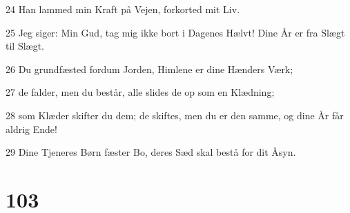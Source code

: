 \par 24 Han lammed min Kraft på Vejen, forkorted mit Liv.
\par 25 Jeg siger: Min Gud, tag mig ikke bort i Dagenes Hælvt! Dine År er fra Slægt til Slægt.
\par 26 Du grundfæsted fordum Jorden, Himlene er dine Hænders Værk;
\par 27 de falder, men du består, alle slides de op som en Klædning;
\par 28 som Klæder skifter du dem; de skiftes, men du er den samme, og dine År får aldrig Ende!
\par 29 Dine Tjeneres Børn fæster Bo, deres Sæd skal bestå for dit Åsyn.

\chapter{103}


